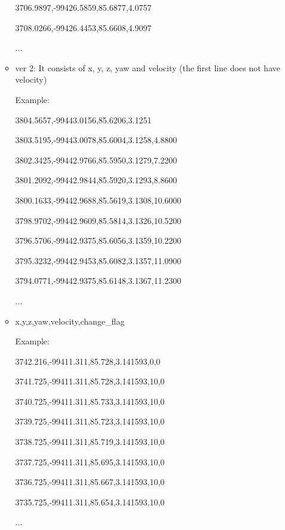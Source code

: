 \documentclass[
10pt, %
a4paper, %
oneside, %
BCOR5mm, %
]{scrartcl}
\begin{document}
\begin{itemize}
\begin{itemize}
    3706.9897,-99426.5859,85.6877,4.0757
    
    3708.0266,-99426.4453,85.6608,4.9097
    
    ... 
    
    \item ver 2: It consists of x, y, z, yaw and velocity (the first line does not have velocity)
    
    Example: 
    
    3804.5657,-99443.0156,85.6206,3.1251
    
3803.5195,-99443.0078,85.6004,3.1258,4.8800

3802.3425,-99442.9766,85.5950,3.1279,7.2200

3801.2092,-99442.9844,85.5920,3.1293,8.8600

3800.1633,-99442.9688,85.5619,3.1308,10.6000

3798.9702,-99442.9609,85.5814,3.1326,10.5200

3796.5706,-99442.9375,85.6056,3.1359,10.2200

3795.3232,-99442.9453,85.6082,3.1357,11.0900

3794.0771,-99442.9375,85.6148,3.1367,11.2300

... 
    
    
 \item  x,y,z,yaw,velocity,change_flag
 
 Example:
 
3742.216,-99411.311,85.728,3.141593,0,0

3741.725,-99411.311,85.728,3.141593,10,0

3740.725,-99411.311,85.733,3.141593,10,0

3739.725,-99411.311,85.723,3.141593,10,0

3738.725,-99411.311,85.719,3.141593,10,0

3737.725,-99411.311,85.695,3.141593,10,0

3736.725,-99411.311,85.667,3.141593,10,0

3735.725,-99411.311,85.654,3.141593,10,0

... 
	\end{itemize}
	
\end{itemize}



 





\renewcommand{\refname}{\spacedlowsmallcaps{References}} %




\end{document}
